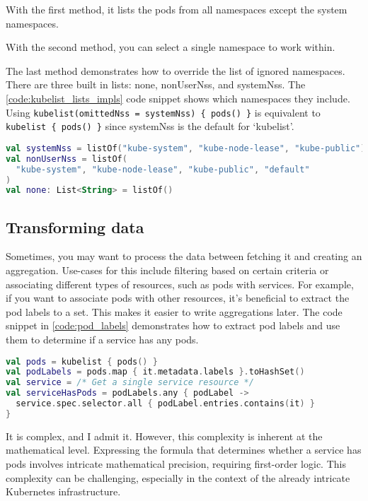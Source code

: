 With the first method, it lists the pods from all namespaces except the system namespaces.

With the second method, you can select a single namespace to work within.

The last method demonstrates how to override the list of ignored namespaces. There are three built in lists: none, nonUserNss, and systemNss. The \ref{code:kubelist_lists_impls} code snippet shows which namespaces they include. Using \lstinline|kubelist(omittedNss = systemNss) { pods() }| is equivalent to \lstinline|kubelist { pods() }| since systemNss is the default for `kubelist'.

\begin{minipage}{\linewidth}
\begin{lstlisting}[caption={Namespace list constants},language=Kotlin,label=code:kubelist_lists_impls]
val systemNss = listOf("kube-system", "kube-node-lease", "kube-public")
val nonUserNss = listOf(
  "kube-system", "kube-node-lease", "kube-public", "default"
)
val none: List<String> = listOf()
\end{lstlisting}
\end{minipage}

\subsection{Transforming data}

Sometimes, you may want to process the data between fetching it and creating an aggregation. Use-cases for this include filtering based on certain criteria or associating different types of resources, such as pods with services. For example, if you want to associate pods with other resources, it's beneficial to extract the pod labels to a set. This makes it easier to write aggregations later. The code snippet in \ref{code:pod_labels} demonstrates how to extract pod labels and use them to determine if a service has any pods.

\begin{lstlisting}[caption={Extraction of pod labels},language=Kotlin,label=code:pod_labels]
val pods = kubelist { pods() }
val podLabels = pods.map { it.metadata.labels }.toHashSet()
val service = /* Get a single service resource */
val serviceHasPods = podLabels.any { podLabel ->
  service.spec.selector.all { podLabel.entries.contains(it) }
}
\end{lstlisting}

It is complex, and I admit it. However, this complexity is inherent at the mathematical level. Expressing the formula that determines whether a service has pods involves intricate mathematical precision, requiring first-order logic. This complexity can be challenging, especially in the context of the already intricate Kubernetes infrastructure.

